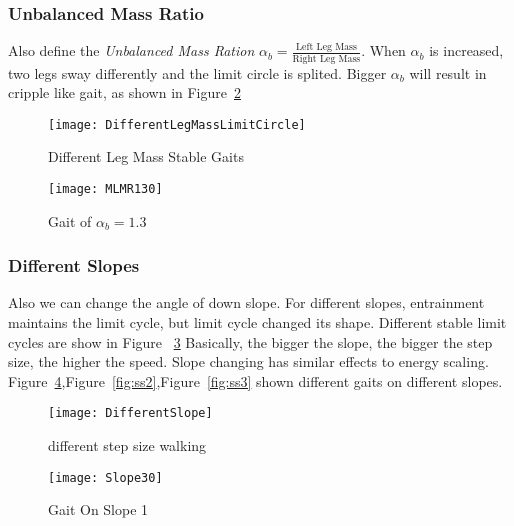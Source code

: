 \subsubsection*{Unbalanced Mass Ratio}
Also define the \emph{Unbalanced Mass Ration} $\alpha_b=\frac{\text{Left Leg Mass}}{\text{Right Leg Mass}}$.
When $\alpha_b$ is increased, two legs sway differently and the limit circle is splited.
Bigger $\alpha_b$  will result in cripple like gait, as shown in Figure~\ref{fig:lm2}

\begin{figure}[!htbp]
  \begin{center}
      \texttt{[image: DifferentLegMassLimitCircle]}
    \caption{Different Leg Mass Stable Gaits}
    \label{fig:differentlr}
\end{center}
\end{figure}




\begin{figure}[!htbp]
  \begin{center}
      \texttt{[image: MLMR130]}
    \caption{Gait of $\alpha_b=1.3$}
    \label{fig:lm2}
\end{center}
\end{figure}



\subsubsection*{Different Slopes}
Also we can change the angle of down slope.
For different slopes, entrainment maintains the limit cycle, but limit cycle changed its shape.
Different stable limit cycles are show in Figure ~\ref{fig:diffslopes}
Basically, the bigger the slope, the bigger the step size, the higher the speed.
Slope changing has similar effects to energy scaling.
Figure~\ref{fig:ss1},Figure~\ref{fig:ss2},Figure~\ref{fig:ss3} shown different gaits on different slopes.


\begin{figure}[!htbp]
  \begin{center}
      \texttt{[image: DifferentSlope]}
    \caption{different step size walking}
    \label{fig:diffslopes}
\end{center}
\end{figure}


\begin{figure}[!htbp]
  \begin{center}
      \texttt{[image: Slope30]}
    \caption{Gait On Slope 1} 
    \label{fig:ss1}
\end{center}
\end{figure}

